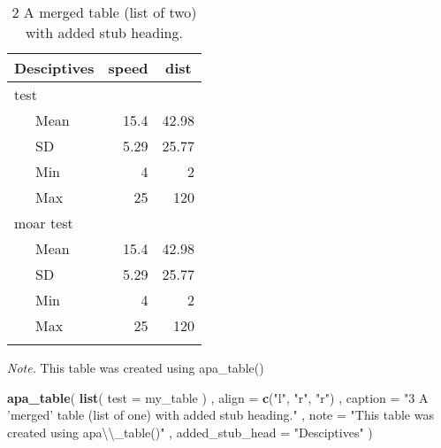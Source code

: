 \documentclass[english,man]{apa6}
\newenvironment{Shaded}{\begin{snugshade}}{\end{snugshade}}
\newcommand{\KeywordTok}[1]{\textcolor[rgb]{0.13,0.29,0.53}{\textbf{{#1}}}}
\newcommand{\DataTypeTok}[1]{\textcolor[rgb]{0.13,0.29,0.53}{{#1}}}
\newcommand{\CharTok}[1]{\textcolor[rgb]{0.31,0.60,0.02}{{#1}}}
\newcommand{\StringTok}[1]{\textcolor[rgb]{0.31,0.60,0.02}{{#1}}}
\newcommand{\NormalTok}[1]{{#1}}
\begin{document}
\begin{table}[tbp]
\begin{center}
\begin{threeparttable}
\caption{\label{tab:unnamed-chunk-3}2 A merged table (list of two) with added stub heading.}
\begin{tabular}{lrr}
\toprule
Desciptives & \multicolumn{1}{c}{speed} & \multicolumn{1}{c}{dist}\\
\midrule
test &  & \\
\ \ \ Mean & 15.4 & 42.98\\
\ \ \ SD & 5.29 & 25.77\\
\ \ \ Min & 4 & 2\\
\ \ \ Max & 25 & 120\\
moar test &  & \\
\ \ \ Mean & 15.4 & 42.98\\
\ \ \ SD & 5.29 & 25.77\\
\ \ \ Min & 4 & 2\\
\ \ \ Max & 25 & 120\\
\bottomrule
\addlinespace
\end{tabular}
\begin{tablenotes}[para]
\textit{Note.} This table was created using apa\_table()
\end{tablenotes}
\end{threeparttable}
\end{center}
\end{table}

\begin{Shaded}
\begin{Highlighting}[]
\KeywordTok{apa_table}\NormalTok{(}
  \KeywordTok{list}\NormalTok{(}
    \DataTypeTok{test =} \NormalTok{my_table}
  \NormalTok{)}
  \NormalTok{, }\DataTypeTok{align =} \KeywordTok{c}\NormalTok{(}\StringTok{"l"}\NormalTok{, }\StringTok{"r"}\NormalTok{, }\StringTok{"r"}\NormalTok{)}
  \NormalTok{, }\DataTypeTok{caption =} \StringTok{"3 A 'merged' table (list of one) with added stub heading."}
  \NormalTok{, }\DataTypeTok{note =} \StringTok{"This table was created using apa}\CharTok{\textbackslash{}\textbackslash{}}\StringTok{_table()"}
  \NormalTok{, }\DataTypeTok{added_stub_head =} \StringTok{"Desciptives"}
\NormalTok{)}
\end{Highlighting}
\end{Shaded}
\end{document}

